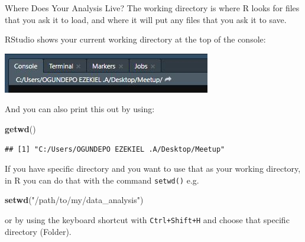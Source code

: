 \documentclass[
  ignorenonframetext,
]{beamer}
\newenvironment{Shaded}{\begin{snugshade}}{\end{snugshade}}
\newcommand{\KeywordTok}[1]{\textcolor[rgb]{0.13,0.29,0.53}{\textbf{#1}}}
\newcommand{\NormalTok}[1]{#1}
\newcommand{\StringTok}[1]{\textcolor[rgb]{0.31,0.60,0.02}{#1}}
\begin{document}
\begin{frame}[fragile]{Where Does Your Analysis Live?}
\protect\hypertarget{where-does-your-analysis-live}{}
\pause
The working directory is where R looks for files that you ask it to
load, and where it will put any files that you ask it to save.\pause

RStudio shows your current working directory at the top of the console:

\includegraphics{Images/wd.JPG} \pause

And you can also print this out by using:

\begin{Shaded}
\begin{Highlighting}[]
\KeywordTok{getwd}\NormalTok{()}
\end{Highlighting}
\end{Shaded}

\begin{verbatim}
## [1] "C:/Users/OGUNDEPO EZEKIEL .A/Desktop/Meetup"
\end{verbatim}

\end{frame}

\begin{frame}[fragile]{}
\protect\hypertarget{section-1}{}

If you have specific directory and you want to use that as your working
directory, in R you can do that with the command \texttt{setwd()} e.g. \pause

\begin{Shaded}
\begin{Highlighting}[]
\KeywordTok{setwd}\NormalTok{(}\StringTok{"/path/to/my/data_analysis"}\NormalTok{)}
\end{Highlighting}
\end{Shaded}

or by using the keyboard shortcut with \texttt{Ctrl+Shift+H} and choose
that specific directory (Folder).

\end{frame}
\end{document}
